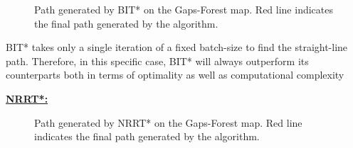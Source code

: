 \documentclass{article}
\begin{document}
\begin{figure}[H]
	\caption{Path generated by BIT* on the Gaps-Forest map. Red line indicates the final path generated by the algorithm.}
	\label{bit:straightlinepath}
\end{figure}

BIT* takes only a single iteration of a fixed batch-size to find the straight-line path. Therefore, in this specific case, BIT* will always outperform its counterparts both in terms of optimality as well as computational complexity

\textbf{\underline{NRRT*:}}

\begin{figure}[H]
	\caption{Path generated by NRRT* on the Gaps-Forest map. Red line indicates the final path generated by the algorithm.}
	\label{nrrt:straightlinepath}
\end{figure}
\end{document}

